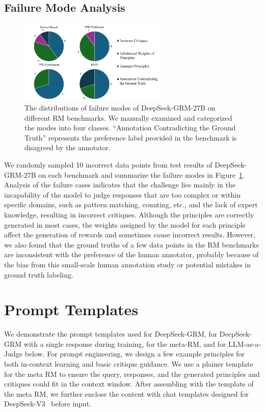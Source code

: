 \documentclass{article} %
\newcommand{\SGRM}{DeepSeek-GRM-27B\xspace}
\newcommand{\SGRMAll}{DeepSeek-GRM\xspace}
\begin{document}
\subsection{Failure Mode Analysis}\label{app:failure}

\begin{figure}[ht]
  \centering
  \includegraphics[width=0.63\textwidth]{figures/fig7.pdf}
  \caption{The distributions of failure modes of \SGRM on different RM benchmarks. We manually examined and categorized the modes into four classes. ``Annotation Contradicting the Ground Truth'' represents the preference label provided in the benchmark is disagreed by the annotator.}
  \label{fig:failure-mode}
\end{figure}

We randomly sampled 10 incorrect data points from test results of \SGRM on each benchmark and summarize the failure modes in Figure~\ref{fig:failure-mode}. 
Analysis of the failure cases indicates that the challenge lies mainly in the incapability of the model to judge responses that are too complex or within specific domains, such as pattern matching, counting, etc., and the lack of expert knowledge,  resulting in incorrect critiques. Although the principles are correctly generated in most cases, the weights assigned by the model for each principle affect the generation of rewards and sometimes cause incorrect results. However, we also found that the ground truths of a few data points in the RM benchmarks are inconsistent with the preference of the human annotator, probably because of the bias from this small-scale human annotation study or potential mistakes in ground truth labeling.  

\section{Prompt Templates}

We demonstrate the prompt templates used for \SGRMAll, for \SGRMAll with a single response during training, for the meta-RM, and for LLM-as-a-Judge below. For prompt engineering, we design a few example principles for both in-context learning and basic critique guidance. We use a plainer template for the meta RM to ensure the query, responses, and the generated principles and critiques could fit in the context window. After assembling with the template of the meta RM, we further enclose the content with chat templates designed for DeepSeek-V3~\citep{deepseekai2024deepseekv3technicalreport} before input. 
\end{document}
